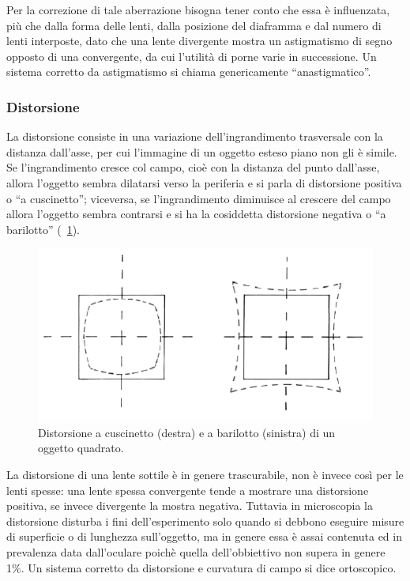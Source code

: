 Per la correzione di tale aberrazione bisogna tener conto che essa è influenzata, più che dalla forma delle lenti, dalla posizione del diaframma e dal numero di lenti interposte, dato che una lente divergente mostra un astigmatismo di segno opposto di una convergente, da cui l'utilità di porne varie in successione. 
Un sistema corretto da astigmatismo si chiama genericamente ``anastigmatico''. 

\subsubsection*{Distorsione}
La distorsione consiste in una variazione dell'ingrandimento trasversale con la distanza dall'asse, per cui l'immagine di un oggetto esteso piano non gli è simile. 
Se l'ingrandimento cresce col campo, cioè con la distanza del punto dall'asse, allora l'oggetto sembra dilatarsi verso la periferia e si parla di distorsione positiva o ``a cuscinetto''; viceversa, se l'ingrandimento diminuisce al crescere del campo allora l'oggetto sembra contrarsi e si ha la cosiddetta distorsione negativa o ``a barilotto'' (\figurename~\ref{fig:distorsione}).

\begin{figure}
 \centering
 \includegraphics[scale=.65]{img/CAP2disto.png}
 \caption{\small{Distorsione a cuscinetto (destra) e a barilotto (sinistra) di un oggetto quadrato.}}
 \label{fig:distorsione}
\end{figure}

La distorsione di una lente sottile è in genere trascurabile, non è invece così per le lenti spesse: una lente spessa convergente tende a mostrare una distorsione positiva, se invece divergente la mostra negativa.
Tuttavia in microscopia la distorsione disturba i fini dell'esperimento solo quando si debbono eseguire misure di superficie o di lunghezza sull'oggetto, ma in genere essa è assai contenuta ed in prevalenza data dall'oculare poichè quella dell'obbiettivo non supera in genere 1\%.
Un sistema corretto da distorsione e curvatura di campo si dice ortoscopico.


